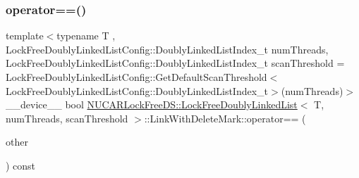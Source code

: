 \subsubsection{\texorpdfstring{operator==()}{operator==()}}
{\footnotesize\ttfamily template$<$typename T , Lock\+Free\+Doubly\+Linked\+List\+Config\+::\+Doubly\+Linked\+List\+Index\+\_\+t num\+Threads, Lock\+Free\+Doubly\+Linked\+List\+Config\+::\+Doubly\+Linked\+List\+Index\+\_\+t scan\+Threshold = Lock\+Free\+Doubly\+Linked\+List\+Config\+::\+Get\+Default\+Scan\+Threshold$<$\+Lock\+Free\+Doubly\+Linked\+List\+Config\+::\+Doubly\+Linked\+List\+Index\+\_\+t$>$(num\+Threads)$>$ \\
\+\_\+\+\_\+device\+\_\+\+\_\+ bool \mbox{\hyperlink{class_n_u_c_a_r_lock_free_d_s_1_1_lock_free_doubly_linked_list}{N\+U\+C\+A\+R\+Lock\+Free\+D\+S\+::\+Lock\+Free\+Doubly\+Linked\+List}}$<$ T, num\+Threads, scan\+Threshold $>$\+::Link\+With\+Delete\+Mark\+::operator== (\begin{DoxyParamCaption}\item[{const \mbox{\hyperlink{class_n_u_c_a_r_lock_free_d_s_1_1_lock_free_doubly_linked_list_1_1_link_with_delete_mark}{Link\+With\+Delete\+Mark}} \&}]{other }\end{DoxyParamCaption}) const\hspace{0.3cm}{\ttfamily [inline]}}

\mbox{\label{class_n_u_c_a_r_lock_free_d_s_1_1_lock_free_doubly_linked_list_1_1_link_with_delete_mark_afc16efcd81c1c4593f90f37d6360ff1d}} 
